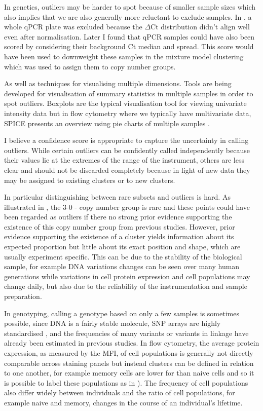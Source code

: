 In genetics, outliers may be harder to spot because of smaller sample sizes which also implies that we are also generally more reluctant to exclude samples.
In , a whole qPCR plate was excluded because the $\Delta$Ct distribution didn’t align well even after normalisation.
Later I found that qPCR samples could have also been scored by considering their background Ct median and spread.
This score would have been used to downweight these samples in the mixture model clustering which was used to assign them to copy number groups.

As well as techniques for visualising multiple dimensions.
Tools are being developed for visualisation of summary statistics in multiple samples in order to spot outliers.
Boxplots are the typical visualisation tool for viewing univariate intensity data but in flow cytometry where we typically have multivariate data,
\gls{SPICE} presents an overview using pie charts of multiple samples \citep{Roederer:2011hy}.

I believe a confidence score is appropriate to capture the uncertainty in calling outliers.
While certain outliers can be confidently called independently because their values lie at the extremes of the range of the instrument, others are less clear and should not be discarded completely because in light of new data they may be assigned to existing clusters or to new clusters.

In particular distinguishing between rare subsets and outliers is hard.
As illustrated in , the 3-0 - copy number group is rare and these points could have been regarded as outliers if there no strong prior evidence supporting the existence of this copy number group from previous studies.
However, prior evidence supporting the existence of a cluster yields information about its expected proportion but little about its exact position and shape, which are usually experiment specific.
This can be due to the stability of the biological sample,  for example DNA variations changes can be seen over many human generations while variations in cell protein expression and cell populations may change daily, but also due to the reliability of the instrumentation and sample preparation.

In genotyping, calling a genotype based on only a few samples is sometimes possible, since DNA is a fairly stable molecule, SNP arrays are highly standardised \citep{Di:2005uj,Giannoulatou:2008ty}, and the frequencies of many variants or variants in linkage have already been estimated in previous studies.
In flow cytometry, the average protein expression, as measured by the \gls{MFI}, of cell populations is generally not directly comparable across staining panels but instead clusters can be defined in relation to one another, for example memory cells are lower for  than naive cells and so it is possible to label these populations as in ).
The frequency of cell populations also differ widely between individuals and the ratio of cell populations, for example naive and memory, changes in the course of an individual's lifetime.

